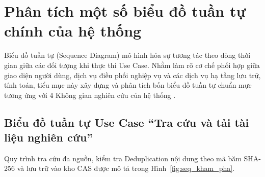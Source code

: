 \section{Phân tích một số biểu đồ tuần tự chính của hệ thống}
\label{sec:bieu_do_tuan_tu}

Biểu đồ tuần tự (Sequence Diagram) mô hình hóa sự tương tác theo dòng thời gian giữa các đối tượng khi thực thi Use Case. Nhằm làm rõ cơ chế phối hợp giữa giao diện người dùng, dịch vụ điều phối nghiệp vụ và các dịch vụ hạ tầng lưu trữ, tính toán, tiểu mục này xây dựng và phân tích bốn biểu đồ tuần tự chuẩn mực tương ứng với 4 Không gian nghiên cứu của hệ thống \VS.

\subsection{Biểu đồ tuần tự Use Case ``Tra cứu và tải tài liệu nghiên cứu''}
\label{subsec:seq_kham_pha}

Quy trình tra cứu đa nguồn, kiểm tra Deduplication nội dung theo mã băm SHA-256 và lưu trữ vào kho CAS được mô tả trong Hình~\ref{fig:seq_kham_pha}.

